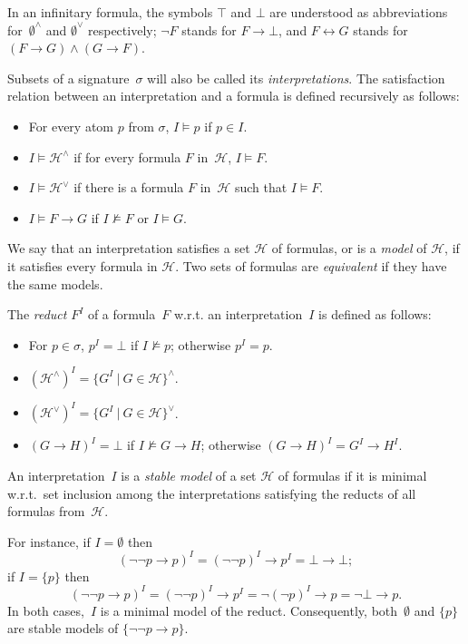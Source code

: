 \documentclass{tlp}
\def\rar{\rightarrow}
\def\lrar{\leftrightarrow}
\begin{document}
In an infinitary formula, the symbols $\top$ and $\bot$ 
are understood as abbreviations 
for~$\emptyset^{\land}$ and $\emptyset^{\lor}$ respectively; 
$\neg F$ stands for $F\rar\bot$, and $F\lrar G$ 
stands for \hbox{$(F\rar G)\land(G\rar F)$}.

Subsets of a signature~$\sigma$ will also be called its {\sl interpretations}.
The satisfaction relation between an interpretation and a formula is
defined recursively as follows:
\begin{itemize}
\item For every atom $p$ from $\sigma$, $I\models p$ if $p\in I$.
\item $I\models\mathcal{H}^\land$ if for every formula $F$ in~$\mathcal{H}$,
$I\models F$.
\item $I\models\mathcal{H}^\lor$ if there is a formula $F$ in~$\mathcal{H}$
such that $I\models F$.
\item $I\models F\rar G$ if $I\not\models F$ or $I\models G$.
\end{itemize}
We say that an interpretation satisfies a set $\mathcal{H}$ of formulas,
or is a {\sl model} of $\mathcal{H}$, if it satisfies every formula in 
$\mathcal{H}$.  Two sets of formulas are {\sl equivalent} if
they have the same models.  

The {\sl reduct} $F^I$ of a formula~$F$ w.r.t. an
interpretation~$I$ is defined as follows:
\begin{itemize}
\item For $p\in \sigma$, $p^I=\bot$ if $I\not\models p$; otherwise $p^I=p$.
\item $(\mathcal{H}^\land)^I=\{G^I\ |\ G\in\mathcal{H}\}^\land$.
\item $(\mathcal{H}^\lor)^I=\{G^I\ |\ G\in\mathcal{H}\}^\lor$.
\item $(G\rar H)^I=\bot$ if $I\not\models G\rar H$; otherwise
\hbox{$(G\rar H)^I=G^I\rar H^I$}.
\end{itemize}
An interpretation~$I$ is a {\sl stable model} of a set $\mathcal{H}$ of
formulas if it is minimal w.r.t.\ set inclusion among the interpretations
satisfying the reducts of all formulas from~$\mathcal{H}$.

For instance, if $I=\emptyset$ then
$$(\neg \neg p \rar p)^I=(\neg \neg p)^I\rar p^I=\bot\rar\bot;$$
if $I=\{p\}$ then
$$(\neg \neg p \rar p)^I=(\neg \neg p)^I\rar p^I=\neg (\neg p)^I\rar p
   =\neg\bot\rar p.$$
In both cases,~$I$ is a minimal model of the reduct.  Consequently,
both~$\emptyset$ and $\{p\}$ are stable models of $\{\neg\neg p\rar p\}$.
\end{document}
